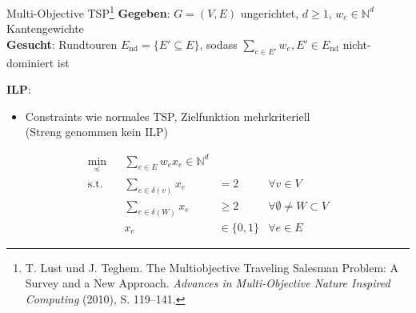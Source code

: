 \documentclass[ngerman,aspectratio=169,10pt]{beamer}
\begin{document}
\begin{frame}{Multi-Objective TSP\footnote{T. Lust und J. Teghem. The Multiobjective Traveling Salesman Problem: A Survey and a New Approach. \emph{Advances in Multi-Objective Nature Inspired Computing} (2010), S. 119–141.}}
	\textbf{Gegeben}: $G=(V,E)$ ungerichtet, $d\geq1$, $w_e\in{\mathbb{N}^d}$ Kantengewichte\\
	\textbf{Gesucht}: Rundtouren $E_\text{nd}=\{E'\subseteq E\}$, sodass $\sum_{e\in E'}w_e,E'\in E_\text{nd}$ nicht-dominiert ist

	\textbf{ILP}:
	\begin{itemize}
		\item Constraints wie normales TSP, Zielfunktion mehrkriteriell\\ (Streng genommen kein ILP)
	\end{itemize}
	\begin{align*}
		{\min}_\preceq && \sum_{e\in E}w_ex_e\in\mathbb{N}^d&&\\
		\text{s.t.} && \sum_{e\in \delta(v)}x_e &=2 &\forall v\in V\\
		&& \sum_{e\in \delta(W)}x_e &\geq2 &\forall \emptyset\neq W\subset V\\
		&& x_e &\in\{0,1\} &\forall e\in E
	\end{align*}
\end{frame}
\end{document}

